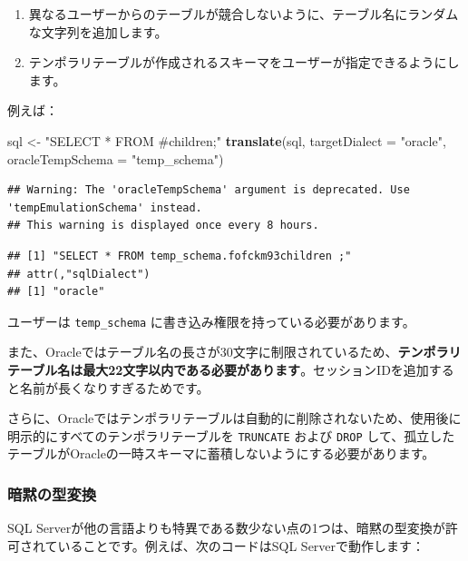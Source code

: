 \documentclass[
  11pt]{book}
\newenvironment{Shaded}{\begin{snugshade}}{\end{snugshade}}
\newcommand{\AttributeTok}[1]{\textcolor[rgb]{0.13,0.29,0.53}{#1}}
\newcommand{\FunctionTok}[1]{\textcolor[rgb]{0.13,0.29,0.53}{\textbf{#1}}}
\newcommand{\NormalTok}[1]{#1}
\newcommand{\OtherTok}[1]{\textcolor[rgb]{0.56,0.35,0.01}{#1}}
\newcommand{\StringTok}[1]{\textcolor[rgb]{0.31,0.60,0.02}{#1}}
\providecommand{\tightlist}{%
  \setlength{\itemsep}{0pt}\setlength{\parskip}{0pt}}
\theoremstyle{definition}
\theoremstyle{definition}
\theoremstyle{definition}
\theoremstyle{definition}
\theoremstyle{remark}
\begin{document}
\begin{enumerate}
\def\labelenumi{\arabic{enumi}.}
\tightlist
\item
  異なるユーザーからのテーブルが競合しないように、テーブル名にランダムな文字列を追加します。
\item
  テンポラリテーブルが作成されるスキーマをユーザーが指定できるようにします。
\end{enumerate}

例えば：

\begin{Shaded}
\begin{Highlighting}[]
\NormalTok{sql }\OtherTok{\textless{}{-}} \StringTok{"SELECT * FROM \#children;"}
\FunctionTok{translate}\NormalTok{(sql, }\AttributeTok{targetDialect =} \StringTok{"oracle"}\NormalTok{, }\AttributeTok{oracleTempSchema =} \StringTok{"temp\_schema"}\NormalTok{)}
\end{Highlighting}
\end{Shaded}

\begin{verbatim}
## Warning: The 'oracleTempSchema' argument is deprecated. Use 'tempEmulationSchema' instead.
## This warning is displayed once every 8 hours.
\end{verbatim}

\begin{verbatim}
## [1] "SELECT * FROM temp_schema.fofckm93children ;"
## attr(,"sqlDialect")
## [1] "oracle"
\end{verbatim}

ユーザーは \texttt{temp\_schema} に書き込み権限を持っている必要があります。

また、Oracleではテーブル名の長さが30文字に制限されているため、\textbf{テンポラリテーブル名は最大22文字以内である必要があります}。セッションIDを追加すると名前が長くなりすぎるためです。

さらに、Oracleではテンポラリテーブルは自動的に削除されないため、使用後に明示的にすべてのテンポラリテーブルを \texttt{TRUNCATE} および \texttt{DROP} して、孤立したテーブルがOracleの一時スキーマに蓄積しないようにする必要があります。

\subsubsection*{暗黙の型変換}\label{ux6697ux9ed9ux306eux578bux5909ux63db}

SQL Serverが他の言語よりも特異である数少ない点の1つは、暗黙の型変換が許可されていることです。例えば、次のコードはSQL Serverで動作します：
\end{document}
